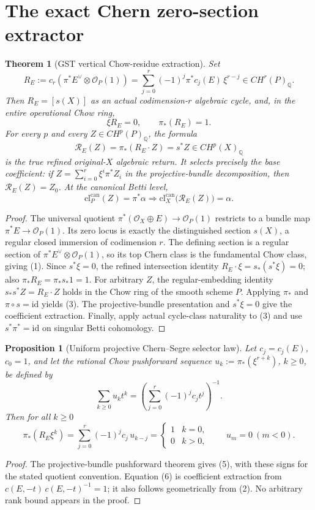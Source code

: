 \documentclass[11pt]{article}
\newtheorem{theorem}{Theorem}
\newtheorem{proposition}{Proposition}
\begin{document}
\section{The exact Chern zero-section extractor}
\begin{theorem}[GST vertical Chow-residue extraction]\label{thm:extract}
Set
\[
 R_E :=
 c_r\!\left(\pi^*E^\vee\otimes\mathcal O_P(1)\right)
 =\sum_{j=0}^r(-1)^j\pi^*c_j(E)\,\xi^{r-j}
 \in CH^r(P)_{\mathbb Q}. \tag{1}
\]
Then \(R_E=[s(X)]\) as an actual codimension-\(r\)
algebraic cycle, and, in the entire operational Chow ring,
\[
 \boxed{\xi R_E=0,\qquad \pi_*(R_E)=1.} \tag{2}
\]
For every \(p\) and every \(Z\in CH^p(P)_{\mathbb Q}\),
the formula
\[
 \boxed{\mathcal R_E(Z)=\pi_*(R_E\cdot Z)
                   =s^*Z\in CH^p(X)_{\mathbb Q}} \tag{3}
\]
is the true refined original-\(X\) algebraic return.
It selects precisely the base coefficient: if
\(Z=\sum_{i=0}^r\xi^i\pi^*Z_i\)
in the projective-bundle decomposition, then
\(\mathcal R_E(Z)=Z_0\).
At the canonical Betti level,
\[
 \boxed{
 \mathrm{cl}^{\mathrm{can}}_P(Z)=\pi^*\alpha
 \Longrightarrow
 \mathrm{cl}^{\mathrm{can}}_X\bigl(\mathcal R_E(Z)\bigr)=\alpha.
 } \tag{4}
\]
\end{theorem}
\begin{proof}
The universal quotient
\(\pi^*(\mathcal O_X\oplus E)\to\mathcal O_P(1)\)
restricts to a bundle map \(\pi^*E\to\mathcal O_P(1)\).
Its zero locus is exactly the distinguished section \(s(X)\),
a regular closed immersion of codimension \(r\). The defining
section is a regular section of
\(\pi^*E^\vee\otimes\mathcal O_P(1)\),
so its top Chern class is the fundamental Chow class,
giving (1). Since \(s^*\xi=0\), the refined intersection
identity \(R_E\cdot\xi=s_*(s^*\xi)=0\);
also \(\pi_*R_E=\pi_*s_*1=1\).
For arbitrary \(Z\), the regular-embedding identity
\(s_*s^*Z=R_E\cdot Z\) holds in the Chow ring of the
smooth scheme \(P\). Applying \(\pi_*\) and
\(\pi\circ s=\mathrm{id}\) yields (3).
The projective-bundle presentation and \(s^*\xi=0\)
give the coefficient extraction. Finally, apply actual
cycle-class naturality to (3) and use
\(s^*\pi^*=\mathrm{id}\) on singular Betti cohomology.
\end{proof}

\begin{proposition}[Uniform projective Chern--Segre selector law]
Let \(c_j=c_j(E)\), \(c_0=1\), and let the rational Chow
pushforward sequence \(u_k:=\pi_*(\xi^{r+k})\), \(k\ge0\),
be defined by
\[
 \sum_{k\ge0}u_k t^k
 = \left(\sum_{j=0}^r(-1)^jc_jt^j\right)^{-1}.
 \tag{5}
\]
Then for all \(k\ge0\)
\[
 \boxed{
 \pi_*(R_E\xi^k)
 =\sum_{j=0}^r(-1)^jc_j\,u_{k-j}
 =\begin{cases}1&k=0,\\0&k>0,\end{cases}}
 \qquad u_m=0\ (m<0). \tag{6}
\]
\end{proposition}
\begin{proof}
The projective-bundle pushforward theorem gives (5),
with these signs for the stated quotient convention.
Equation (6) is coefficient extraction from
\(c(E,-t)\,c(E,-t)^{-1}=1\); it also follows geometrically
from (2). No arbitrary rank bound appears in the proof.
\end{proof}
\end{document}
